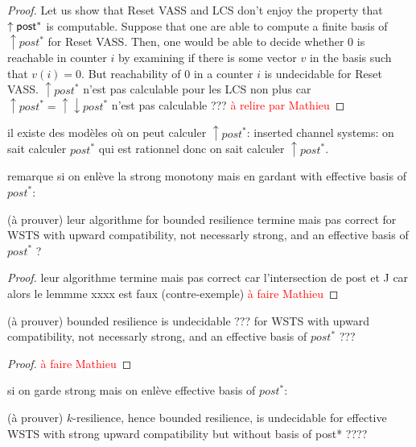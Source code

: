 \begin{proof}
Let us show that Reset VASS and LCS don't enjoy the property that $\uparrow \textsf{post}^*$ is computable.
Suppose that one are able to compute a finite basis of $\uparrow post^*$ for Reset VASS. Then, one would be able to decide whether $0$ is reachable in counter $i$ by examining if there is some vector $v$ in the basis such that $v(i)=0$. But reachability of $0$ in a counter $i$ is undecidable for Reset VASS. 
$\uparrow post^*$ n'est pas calculable pour les LCS non plus car $\uparrow post^*= \uparrow \downarrow post^*$ n'est pas calculable ???
\textcolor{red}{à relire par Mathieu}
\end{proof}

il existe des modèles où on peut calculer $\uparrow post^*$: inserted channel systems: on sait calculer $post^*$ qui est rationnel donc on sait calculer $\uparrow post^*$.

remarque si on enlève la strong monotony mais en gardant with effective basis of $post^*$:


\begin{proposition}(à prouver)
 leur algorithme for {\sc bounded resilience} termine mais pas correct for WSTS with upward compatibility, not necessarly strong, and an effective basis of $post^*$ ?
\end{proposition}

\begin{proof}
leur algorithme termine mais pas correct car l'intersection de post et J car alors le lemmme xxxx est faux (contre-exemple)
 \textcolor{red}{à faire Mathieu}
 
 
\end{proof}

\begin{theorem}(à prouver)
{\sc bounded resilience} is undecidable ??? for WSTS with upward compatibility, not necessarly strong, and an effective basis of $post^*$ ???
\end{theorem}

\begin{proof}
 \textcolor{red}{à faire Mathieu}
\end{proof}


si on garde strong mais on enlève effective basis of $post^*$:

\begin{proposition}(à prouver)
{\sc $k$-resilience}, hence {\sc bounded resilience}, is undecidable for effective WSTS with strong upward compatibility but without basis of post* ????
\end{proposition}

